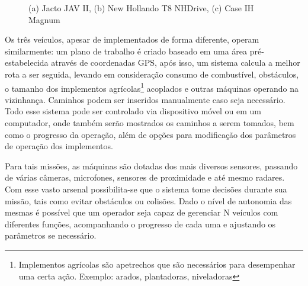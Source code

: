 \begin{figure}[H]
    \begin{center}
    \end{center}
    \caption{%
        (a) Jacto JAV II, (b) New Hollando T8 NHDrive, (c) Case IH Magnum
     }%
\end{figure}


Os três veículos, apesar de implementados de forma diferente, operam similarmente: um plano de trabalho é criado baseado em uma área pré-estabelecida através de coordenadas GPS, após isso, um sistema calcula a melhor rota a ser seguida, levando em consideração consumo de combustível, obstáculos, o tamanho dos implementos agrícolas\footnote{Implementos agrícolas são apetrechos que são necessários para desempenhar uma certa ação. Exemplo: arados, plantadoras, niveladoras} acoplados e outras máquinas operando na vizinhança. Caminhos podem ser inseridos manualmente caso seja necessário. Todo esse sistema pode ser controlado via dispositivo móvel ou em um computador, onde também serão mostrados os caminhos a serem tomados, bem como o progresso da operação, além de opções para modificação dos parâmetros de operação dos implementos.

Para tais missões, as máquinas são dotadas dos mais diversos sensores, passando de várias câmeras, microfones, sensores de proximidade e até mesmo radares. Com esse vasto arsenal possibilita-se que o sistema tome decisões durante sua missão, tais como evitar obstáculos ou colisões. Dado o nível de autonomia das mesmas é possível que um operador seja capaz de gerenciar N veículos com diferentes funções, acompanhando o progresso de cada uma e ajustando os parâmetros se necessário.

